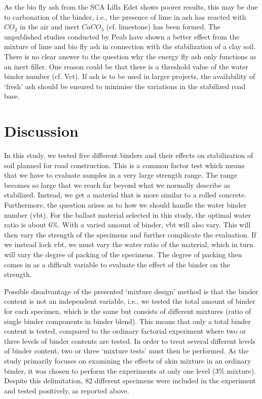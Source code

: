 \documentclass[constrmater,article,submit,pdftex,moreauthors]{Definitions/mdpi}
\begin{document}
As the bio fly ash from the SCA Lilla Edet shows poorer results, this may be due to carbonation of the binder, i.e., the presence of lime in ash has reacted with $CO_2$ in the air and inert $CaCO_3$ (cf. limestone) has been formed. The unpublished studies conducted by Peab have shown a better effect from the mixture of lime and bio fly ash in connection with the stabilization of a clay soil. There is no clear answer to the question why the energy fly ash only functions as an inert filler. One reason could be that there is a threshold value of the water binder number (cf. Vct). If ash is to be used in larger projects, the availability of ‘fresh’ ash should be ensured to minimise the variations in the stabilized road base.

\section{Discussion}

In this study, we tested five different binders and their effects on stabilization of soil planned for road construction. This is a common factor test which means that we have to evaluate samples in a very large strength range. The range becomes so large that we reach far beyond what we normally describe as stabilized. Instead, we get a material that is more similar to a rolled concrete. Furthermore, the question arises as to how we should handle the water binder number (vbt). For the ballast material selected in this study, the optimal water ratio is about 6\%. With a varied amount of binder, vbt will also vary. This will then vary the strength of the specimens and further complicate the evaluation. If we instead lock vbt, we must vary the water ratio of the material, which in turn will vary the degree of packing of the specimens. The degree of packing then comes in as a difficult variable to evaluate the effect of the binder on the strength.

Possible disadvantage of the presented ‘mixture design’ method is that the binder content is not an independent variable, i.e., we tested the total amount of binder for each specimen, which is the same but consists of different mixtures (ratio of single binder components in binder blend). This means that only a total binder content is tested, compared to the ordinary factorial experiment where two or three levels of binder contents are tested. In order to treat several different levels of binder content, two or three ‘mixture tests’ must then be performed. As the study primarily focuses on examining the effects of akin mixture in an ordinary binder, it was chosen to perform the experiments at only one level (3\% mixture). Despite this delimitation, 82 different specimens were included in the experiment and tested positively, as reported above. 
\end{document}
